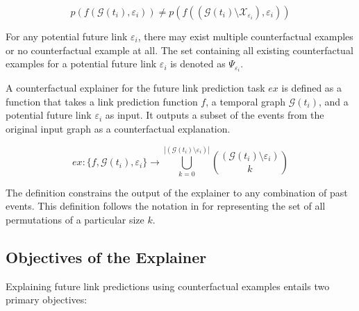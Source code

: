 \begin{equation}
    \label{e_CFExplanation}
    p(f(\mathcal{G}(t_i), \varepsilon_{i})) \neq p(f((\mathcal{G}(t_i) \setminus \mathcal{X}_{\varepsilon_i}), \varepsilon_{i}))
\end{equation}

For any potential future link $\varepsilon_{i}$, there may exist multiple counterfactual examples or no counterfactual example at all. The set containing all existing counterfactual examples for a potential future link $\varepsilon_{i}$ is denoted as $\Psi_{\varepsilon_i}$.

A counterfactual explainer for the future link prediction task $ex$ is defined as a function that takes a link prediction function $f$, a temporal graph $\mathcal{G}(t_i)$, and a potential future link $\varepsilon_i$ as input. It outputs a subset of the events from the original input graph as a counterfactual explanation.

\begin{equation}
    \label{e_Explainer}
    ex: \{f, \mathcal{G}(t_i), \varepsilon_i\} \rightarrow \bigcup_{k = 0}^{|(\mathcal{G}(t_i) \setminus \varepsilon_i)|} {(\mathcal{G}(t_i) \setminus \varepsilon_i) \choose k}
\end{equation}

The definition constrains the output of the explainer to any combination of past events. This definition follows the notation in \cite{stanley_enumerative_1986} for representing the set of all permutations of a particular size $k$.

\subsection{Objectives of the Explainer}
\label{s_ProblemFormulation_Objectives}

Explaining future link predictions using counterfactual examples entails two primary objectives:

